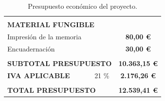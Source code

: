 \begin{table}[H]
{\begin{tabular}{lllllc}
& & & & &
\multicolumn{1}{l}{} \\

\multicolumn{6}{l}{\textbf{MATERIAL FUNGIBLE}} \\
\hline

\multicolumn{5}{|l|}{Impresión de la memoria} &
\multicolumn{1}{c|}{\textbf{80,00 \euro}} \\
\hline

\multicolumn{5}{|l|}{Encuadernación} &
\multicolumn{1}{c|}{\textbf{30,00 \euro}} \\
\hline

& & & & &
\multicolumn{1}{l}{} \\
\hline

\multicolumn{5}{|l|}{\textbf{SUBTOTAL PRESUPUESTO}} &
\multicolumn{1}{c|}{\textbf{10.363,15 \euro}} \\
\hline

\multicolumn{4}{|l|}{\textbf{IVA APLICABLE}} &
\multicolumn{1}{c|}{21 \%} &
\multicolumn{1}{c|}{\textbf{2.176,26 \euro}} \\
\hline

& & & & &
\multicolumn{1}{l}{} \\
\hline

\multicolumn{5}{|l|}{\textbf{TOTAL PRESUPUESTO}} &
\multicolumn{1}{c|}{\textbf{12.539,41 \euro}} \\
\hline

\end{tabular}}
    \caption{Presupuesto económico del proyecto.}
    \label{presupuesto-economico}

\end{table}
